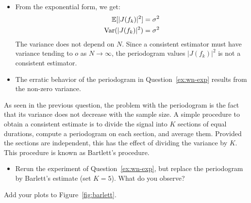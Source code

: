 \documentclass[11pt]{article}
\begin{document}
\begin{solution}
\begin{itemize}
        
        
        \item From the exponential form, we get: $$\begin{aligned}
            \mathbb{E}[|J(f_k)|^2] &= \sigma^2\\
            \mathrm{Var} (|J(f_k)|^2) &= \sigma^2
        \end{aligned}$$
        The variance does not depend on $N$. Since a consistent estimator must have variance tending to $o$ as $N \to \infty$, the periodogram values $|J(f_k)|^2$ is not a consistent estimator.

        
        \item The erratic behavior of the periodogram in Question~\ref{ex:wn-exp} results from the non-zero variance. 
        
    \end{itemize}
\end{solution}

\begin{exercise}\label{q:barlett}
    As seen in the previous question, the problem with the periodogram is the fact that its variance does not decrease with the sample size.
    A simple procedure to obtain a consistent estimate is to divide the signal into $K$ sections of equal durations, compute a periodogram on each section, and average them.
    Provided the sections are independent, this has the effect of dividing the variance by $K$. 
    This procedure is known as Bartlett's procedure.
    \begin{itemize}
        \item Rerun the experiment of Question~\ref{ex:wn-exp}, but replace the periodogram by Barlett's estimate (set $K=5$). What do you observe?
    \end{itemize}
    Add your plots to Figure~\ref{fig:barlett}.
\end{exercise}

\end{document}
